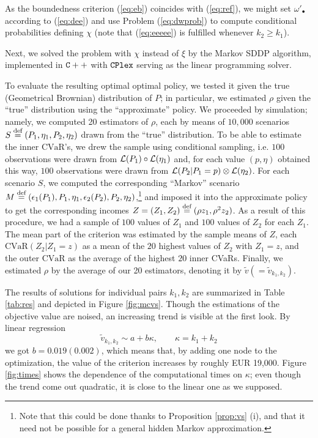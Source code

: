 \documentclass{article}              %
\begin{document}
As the boundedness criterion (\ref{eq:eb}) coincides
with (\ref{eq:ref}), we might set $\omega'_{\bullet}$ according
to (\ref{eq:dee}) and use Problem (\ref{eq:dwprob}) to compute conditional
probabilities defining $\chi$ (note that (\ref{eq:eeeee}) is fulfilled
whenever $k_{2}\geq k_{1}$).

\def\CVaR{\mathrm{CVaR}}

Next, we solved the problem with $\chi$ instead of $\xi$ by the Markov SDDP
algorithm, implemented in ${\tt C++}$ with ${\tt CPlex}$ serving as the
linear programming solver. 

To evaluate the resulting optimal optimal policy, we tested it given the true (Geometrical
Brownian) distribution of $P$; in particular, we estimated $\rho$ given the ``true'' distribution  using the ``approximate'' policy. We proceeded by simulation; namely, we 
computed 20 estimators of $\rho$, each by means of $10,000$ scenarios $S\stackrel{\text{\rm def}}{=}(P_{1},\eta_{1},P_{2},\eta_{2})$ drawn from the ``true'' distribution. To be able to estimate the inner $\CVaR$'s, we drew the sample using conditional sampling, i.e. $100$ observations were drawn from $\mathcal{L}(P_1)\circ\mathcal{L}(\eta_1)$ and, for each value $(p,\eta)$ obtained this way, $100$ observations were drawn from $\mathcal{L}(P_2|P_1=p)\otimes\mathcal{L}(\eta_2)$. For each scenario $S$, we computed the corresponding ``Markov'' scenario $M\stackrel{\text{\rm def}}{=} (\epsilon_{1}(P_{1}),P_{1},\eta_{1},\epsilon_{2}(P_{2}),P_{2},\eta_{2})$,\footnote{Note that this could be done thanks to Proposition \ref{prop:vs} (i), and that it need not be possible for a general hidden Markov approximation.} and imposed it into the approximate policy to get the corresponding incomes $Z=(Z_1,Z_2)\stackrel{\text{\rm def}}{=} (\rho z_1, \rho^2 z_2)$. As a result of this procedure, we had a sample of $100$ values of $Z_1$ and $100$ values of $Z_2$ for each $Z_1$. The mean part of the criterion was estimated by the sample means of $Z$, each $\CVaR(Z_2|Z_1=z)$ as a mean of the $20$ highest values of $Z_2$ with $Z_1=z$, and the outer $\CVaR$ as the average of the highest $20$ inner CVaRs. Finally, we estimated $\rho$ by the average of our 20 estimators, denoting it by $\tilde v(=\tilde v_{k_1,k_2})$.

The results of solutions for individual pairs $k_1,k_2$ are summarized in Table
\ref{tab:res} and depicted in Figure \ref{fig:mcvs}. Though
the estimations of the objective value are noised, an increasing trend is visible
at the first look. By linear regression
\[
\tilde{v}_{k_1,k_2}\sim a+b\kappa,\qquad \kappa=k_{1}+k_{2}
\]
we got $b=0.019(0.002)$, which means that, by adding one node to the
optimization, the value of the criterion increases by roughly EUR 19,000.
Figure \ref{fig:times} shows the dependence of the computational
times on $\kappa$; even though the trend come out quadratic, it is
close to the linear one as we supposed.
\end{document}
